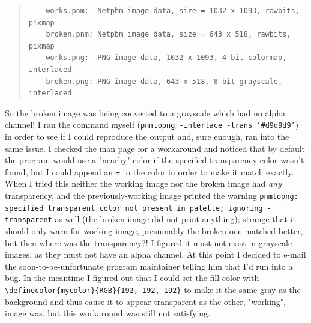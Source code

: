 \documentclass{article}
\begin{document}
\begin{quote}
\begin{verbatim}
	works.pnm:  Netpbm image data, size = 1032 x 1093, rawbits, pixmap
	broken.pnm: Netpbm image data, size = 643 x 518, rawbits, pixmap
	works.png:  PNG image data, 1032 x 1093, 4-bit colormap, interlaced
	broken.png: PNG image data, 643 x 518, 8-bit grayscale, interlaced
\end{verbatim}
\end{quote}
So the broken image was being converted to a grayscale which had no alpha channel!  I ran the command myself (\texttt{pnmtopng -interlace -trans '#d9d9d9'}) in order to see if I could reproduce the output and, sure enough, ran into the same issue.  I checked the man page for a workaround and noticed that by default the program would use a "nearby" color if the specified transparency color wasn't found, but I could append an \texttt{=} to the color in order to make it match exactly.  When I tried this neither the working image nor the broken image had \emph{any} transparency, and the previously-working image printed the warning \texttt{pnmtopng: specified transparent color not present in palette; ignoring -transparent} as well (the broken image did not print anything); strange that it should only warn for working image, presumably the broken one matched better, but then where was the transparency?!  I figured it must not exist in grayscale images, as they must not have an alpha channel.  At this point I decided to e-mail the soon-to-be-unfortunate program maintainer telling him that I'd run into a bug.  In the meantime I figured out that I could set the fill color with \verb+\definecolor{mycolor}{RGB}{192, 192, 192}+ to make it the same gray as the background and thus cause it to appear transparent as the other, "working", image was, but this workaround was still not satisfying.
\end{document}
